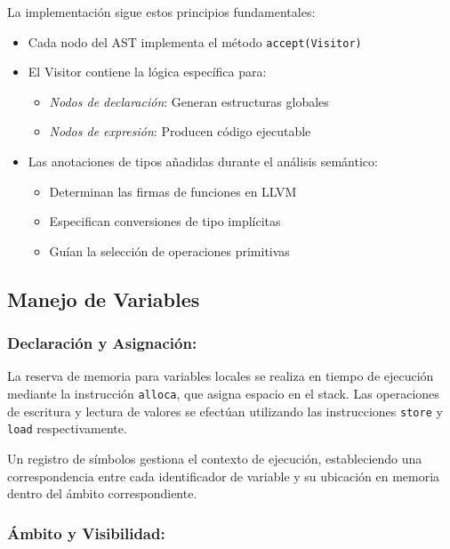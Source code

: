 \documentclass{article}
\begin{document}
La implementación sigue estos principios fundamentales:

\begin{itemize}
    \item Cada nodo del AST implementa el método \texttt{accept(Visitor)}
    
    \item El Visitor contiene la lógica específica para:
    \begin{itemize}
        \item \textit{Nodos de declaración}: Generan estructuras globales
        \item \textit{Nodos de expresión}: Producen código ejecutable
    \end{itemize}
    
    \item Las anotaciones de tipos añadidas durante el análisis semántico:
    \begin{itemize}
        \item Determinan las firmas de funciones en LLVM
        \item Especifican conversiones de tipo implícitas
        \item Guían la selección de operaciones primitivas
    \end{itemize}
\end{itemize}

\subsection{Manejo de Variables}

\subsubsection{Declaración y Asignación:}

La reserva de memoria para variables locales se realiza en tiempo de ejecución mediante la instrucción \texttt{alloca}, que asigna espacio en el stack. Las operaciones de escritura y lectura de valores se efectúan utilizando las instrucciones \texttt{store} y \texttt{load} respectivamente.

Un registro de símbolos gestiona el contexto de ejecución, estableciendo una correspondencia entre cada identificador de variable y su ubicación en memoria dentro del ámbito correspondiente.

\subsubsection{Ámbito y Visibilidad:}
\end{document}
